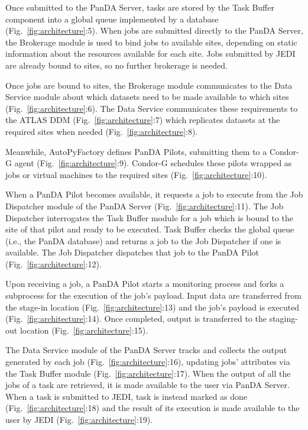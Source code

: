 Once submitted to the PanDA Server, tasks are stored by the Task Buffer
component into a global queue implemented by a database
(Fig.~\ref{fig:architecture}:5). When jobs are submitted directly to the PanDA
Server, the Brokerage module is used to bind jobs to available sites, depending
on static information about the resources available for each site. Jobs
submitted by JEDI are already bound to sites, so no further brokerage is
needed.

Once jobs are bound to sites, the Brokerage module communicates to the Data
Service module about which datasets need to be made available to which sites
(Fig.~\ref{fig:architecture}:6). The Data Service communicates these
requirements to the ATLAS DDM (Fig.~\ref{fig:architecture}:7) which replicates
datasets at the required sites when needed (Fig.~\ref{fig:architecture}:8).

Meanwhile, AutoPyFactory defines PanDA Pilots, submitting them to a Condor-G
agent (Fig.~\ref{fig:architecture}:9). Condor-G schedules these pilots wrapped
as jobs or virtual machines to the required sites
(Fig.~\ref{fig:architecture}:10).

When a PanDA Pilot becomes available, it requests a job to execute from the Job
Dispatcher module of the PanDA Server (Fig.~\ref{fig:architecture}:11). The Job
Dispatcher interrogates the Task Buffer module for a job which is bound to the
site of that pilot and ready to be executed. Task Buffer checks the global
queue (i.e., the PanDA database) and returns a job to the Job Dispatcher if one
is available. The Job Dispatcher dispatches that job to the PanDA Pilot
(Fig.~\ref{fig:architecture}:12).

Upon receiving a job, a PanDA Pilot starts a monitoring process and forks a
subprocess for the execution of the job's payload. Input data are transferred
from the stage-in location (Fig.~\ref{fig:architecture}:13) and the job's
payload is executed (Fig.~\ref{fig:architecture}:14). Once completed, output is
transferred to the staging-out location (Fig.~\ref{fig:architecture}:15).

The Data Service module of the PanDA Server tracks and collects the output
generated by each job (Fig.~\ref{fig:architecture}:16), updating jobs'
attributes via the Task Buffer module (Fig.~\ref{fig:architecture}:17). When
the output of all the jobs of a task are retrieved, it is made available to the
user via PanDA Server. When a task is submitted to JEDI, task is instead marked
as done (Fig.~\ref{fig:architecture}:18) and the result of its execution is
made available to the user by JEDI (Fig.~\ref{fig:architecture}:19).

